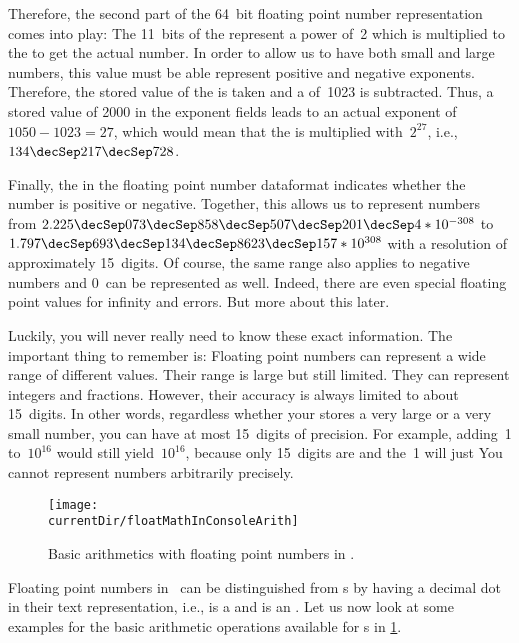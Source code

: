 Therefore, the second part of the 64~bit floating point number representation comes into play:
The 11~bits of the  represent a power of~2 which is multiplied to the  to get the actual number.
In order to allow us to have both small and large numbers, this value must be able represent positive and negative exponents.
Therefore, the stored value of the  is taken and a  of~1023 is subtracted.
Thus, a stored value of 2000 in the exponent fields leads to an actual exponent of $1050-1023=27$, which would mean that the  is multiplied with~$2^{27}$, i.e., $134\decSep217\decSep728$.%
%
\begin{sloppypar}%
Finally, the  in the floating point number dataformat indicates whether the number is positive or negative.
Together, this allows us to represent numbers from $2.225\decSep073\decSep858\decSep507\decSep201\decSep4*10^{-308}$ to $1.797\decSep693\decSep134\decSep8623\decSep157*10^{308}$ with a resolution of approximately 15~digits.
Of course, the same range also applies to negative numbers and $0$~can be represented as well.
Indeed, there are even special floating point values for infinity and errors.
But more about this later.%
\end{sloppypar}%
%
Luckily, you will never really need to know these exact information.
The important thing to remember is:
Floating point numbers can represent a wide range of different values.
Their range is large but still limited.
They can represent integers and fractions.
However, their accuracy is always limited to about 15~digits.
In other words, regardless whether your  stores a very large or a very small number, you can have at most 15~digits of precision.
For example, adding~1 to~$10^{16}$ would still yield~$10^{16}$, because only 15~digits are  and the~1 will just 
You cannot represent numbers arbitrarily precisely.%
\endhsection%
%
%
%
\begin{figure}%
\centering%
\texttt{[image: \\currentDir/floatMathInConsoleArith]}%
\caption{Basic arithmetics with floating point numbers in \python.}%
\label{fig:floatMathInConsoleArith}%
\end{figure}%
%
Floating point numbers in \python\ can be distinguished from s by having a decimal dot in their text representation, i.e.,  is a  and  is an .
Let us now look at some examples for the basic arithmetic operations available for s in \cref{fig:floatMathInConsoleArith}.

